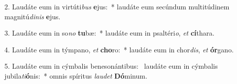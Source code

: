 2. Laudáte eum in virtúti\textit{bus} \textbf{e}jus:~*  laudáte eum secúndum multitúdinem magnitú\textit{di}\textit{nis} \textbf{e}jus.\

3. Laudáte eum in so\textit{no} \textbf{tu}bæ:~*  laudáte eum in psaltéri\textit{o}, \textit{et} \textbf{cí}thara.\

4. Laudáte eum in týmpano, \textit{et} \textbf{cho}ro:~*  laudáte eum in chor\textit{dis}, \textit{et} \textbf{ór}gano.\

5. Laudáte eum in cýmbalis benesonántibus: \dag\  laudáte eum in cýmbalis jubila\textit{ti}\textbf{ó}nis:~*  omnis spíritus \textit{lau}\textit{det} \textbf{Dó}minum.\

